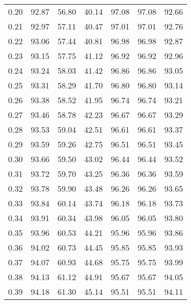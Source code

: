 \begin{tabular}{|c|c|c|c|c|c|c|}
      0.20 &     92.87 &     56.80 &      40.14 &   97.08 &      97.08 &         92.66 \\
      0.21 &     92.97 &     57.11 &      40.47 &   97.01 &      97.01 &         92.76 \\
      0.22 &     93.06 &     57.44 &      40.81 &   96.98 &      96.98 &         92.87 \\
      0.23 &     93.15 &     57.75 &      41.12 &   96.92 &      96.92 &         92.96 \\
      0.24 &     93.24 &     58.03 &      41.42 &   96.86 &      96.86 &         93.05 \\
      0.25 &     93.31 &     58.29 &      41.70 &   96.80 &      96.80 &         93.14 \\
      0.26 &     93.38 &     58.52 &      41.95 &   96.74 &      96.74 &         93.21 \\
      0.27 &     93.46 &     58.78 &      42.23 &   96.67 &      96.67 &         93.29 \\
      0.28 &     93.53 &     59.04 &      42.51 &   96.61 &      96.61 &         93.37 \\
      0.29 &     93.59 &     59.26 &      42.75 &   96.51 &      96.51 &         93.45 \\
      0.30 &     93.66 &     59.50 &      43.02 &   96.44 &      96.44 &         93.52 \\
      0.31 &     93.72 &     59.70 &      43.25 &   96.36 &      96.36 &         93.59 \\
      0.32 &     93.78 &     59.90 &      43.48 &   96.26 &      96.26 &         93.65 \\
      0.33 &     93.84 &     60.14 &      43.74 &   96.18 &      96.18 &         93.73 \\
      0.34 &     93.91 &     60.34 &      43.98 &   96.05 &      96.05 &         93.80 \\
      0.35 &     93.96 &     60.53 &      44.21 &   95.96 &      95.96 &         93.86 \\
      0.36 &     94.02 &     60.73 &      44.45 &   95.85 &      95.85 &         93.93 \\
      0.37 &     94.07 &     60.93 &      44.68 &   95.75 &      95.75 &         93.99 \\
      0.38 &     94.13 &     61.12 &      44.91 &   95.67 &      95.67 &         94.05 \\
      0.39 &     94.18 &     61.30 &      45.14 &   95.51 &      95.51 &         94.11 \\

\end{tabular}
